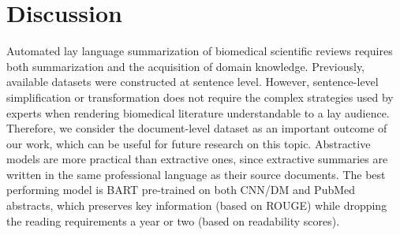 \documentclass[letterpaper, table]{article} %
\begin{document}











\section{Discussion}
Automated lay language summarization of biomedical scientific reviews requires both summarization and the acquisition of domain knowledge.
Previously, available datasets
were constructed at sentence level. However, sentence-level simplification or transformation does not require the complex strategies used by experts when rendering biomedical literature understandable to a lay audience. Therefore, we consider the
document-level dataset as an important outcome of our work,  which
can be useful for future research on this topic.
Abstractive models are more practical than extractive ones,
since extractive summaries
are written
in the same professional language as their source documents.
The best performing model is BART pre-trained on both CNN/DM and PubMed abstracts, which preserves key information (based on ROUGE) while dropping the reading requirements a year or two (based on readability scores).
\end{document}

